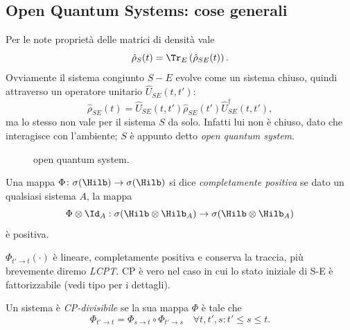 \documentclass[a4]{article}
\begin{document}
\subsection{Open Quantum Systems: cose generali}
Per le note proprietà delle matrici di densità vale 
\[\hat{\rho}_S(t) = \Tr_E\left(\hat{\rho}_{SE}(t)\right).\]
Ovviamente il sistema congiunto \(S-E\) evolve come un sistema chiuso, quindi attraverso un
operatore unitario \(\hat{U}_{SE}(t, t')\):
\[\hat{\rho}_{SE}(t) = \hat{U}_{SE}(t, t') \hat{\rho}_{SE}(t') \hat{U}^{\dag}_{SE}(t, t'),\]
ma lo stesso non vale per il sistema \(S\) da solo. Infatti lui non è chiuso, dato che interagisce
con l'ambiente; \(S\) è appunto detto \emph{open quantum system}.
\begin{figure}[h!]
	\centering
	\resizebox{0.5\textwidth}{!}{}
	\caption{open  quantum system.}
\end{figure}
\begin{defn} Una mappa \(\Phi\colon \sigma(\Hilb) \to \sigma(\Hilb) \)
si dice \emph{completamente positiva} se dato un qualsiasi sistema \(A\), la mappa
\[\Phi \otimes \Id_A: \sigma(\Hilb \otimes \Hilb_A) \to \sigma(\Hilb \otimes \Hilb_A) \]
è positiva.
\end{defn}

\(\Phi_{t'\to t}(\cdot)\) è lineare, completamente positiva e conserva la traccia,
più brevemente  diremo \emph{LCPT}. CP è vero nel caso in cui lo stato iniziale di
S-E è fattorizzabile (vedi tipo \cite{breuer2007theory} per i dettagli).

\begin{defn} Un sistema è \emph{CP-divisibile} se la sua
mappa \(\Phi\) è tale che
\begin{equation} \label{eq:CPdiv}
\Phi_{t'\to t} = \Phi_{s\to t} \circ \Phi_{t'\to s} \quad \forall t, t', s: t' \le s \le t.
\end{equation}
\end{defn}
\end{document}
